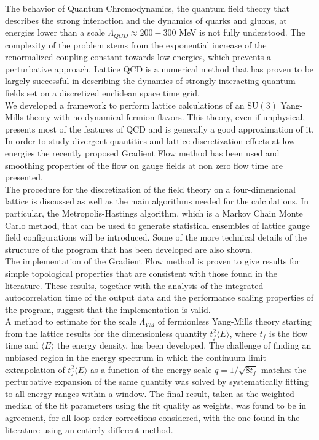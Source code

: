 The behavior of Quantum Chromodynamics, the quantum field theory that describes the strong interaction and the dynamics of quarks and gluons, at energies lower than a scale $\Lambda_{QCD} \approx 200-300$ MeV is not fully understood. The complexity of the problem stems from the exponential increase of the renormalized coupling constant towards low energies, which prevents a perturbative approach. Lattice QCD is a numerical method that has proven to be largely successful in describing the dynamics of strongly interacting quantum fields set on a discretized euclidean space time grid.\\

We developed a framework to perform lattice calculations of an $\mathrm{SU}(3)$ Yang-Mills theory with no dynamical fermion flavors. This theory, even if unphysical, presents most of the features of QCD and is generally a good approximation of it. In order to study divergent quantities and lattice discretization effects at low energies the recently proposed Gradient Flow method \cite{luscher_properties_2010} has been used and smoothing properties of the flow on gauge fields at non zero flow time are presented. \\
The procedure for the discretization of the field theory on a four-dimensional lattice is discussed as well as the main algorithms needed for the calculations. In particular, the Metropolis-Hastings algorithm, which is a Markov Chain Monte Carlo method, that can be used to generate statistical ensembles of lattice gauge field configurations will be introduced. Some of the more technical details of the structure of the program that has been developed are also shown.\\

The implementation of the Gradient Flow method is proven to give results for simple topological properties that are consistent with those found in the literature. These results, together with the analysis of the integrated autocorrelation time of the output data and the performance scaling properties of the program, suggest that the implementation is valid.\\
A method to estimate for the scale $\Lambda_{YM}$ of fermionless Yang-Mills theory starting from the lattice results for the dimensionless quantity $t_f^2\langle E \rangle$, where $t_f$ is the flow time and $\langle E \rangle$ the energy density, has been developed. The challenge of finding an unbiased region in the energy spectrum in which the continuum limit extrapolation of $t_f^2\langle E \rangle$ as a function of the energy scale $q=1/\sqrt{8t_f}$ matches the perturbative expansion of the same quantity was solved by systematically fitting to all energy ranges within a window. The final result, taken as the weighted median of the fit parameters using the fit quality as weights, was found to be in agreement, for all loop-order corrections considered, with the one found in the literature \cite{capitani_non-perturbative_1999} using an entirely different method.
